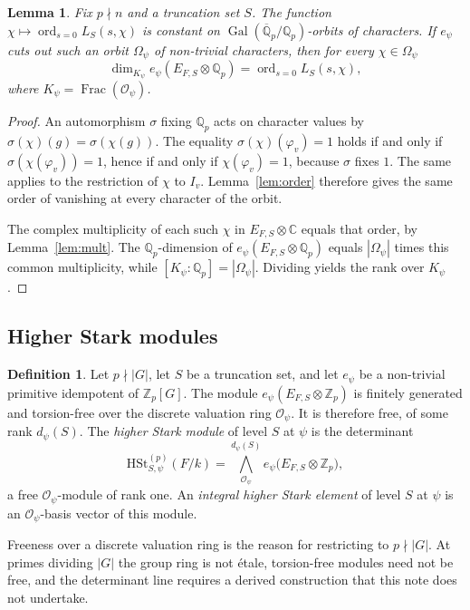 \documentclass[11pt]{article}
\theoremstyle{plain}
\newtheorem{lemma}[theorem]{Lemma}
\theoremstyle{definition}
\newtheorem{definition}[theorem]{Definition}
\theoremstyle{remark}
\newcommand{\Z}{\mathbb{Z}}
\newcommand{\Q}{\mathbb{Q}}
\newcommand{\C}{\mathbb{C}}
\newcommand{\OK}{\mathcal{O}}
\newcommand{\Gal}{\operatorname{Gal}}
\newcommand{\ord}{\operatorname{ord}}
\newcommand{\HSt}{\mathrm{HSt}}
\begin{document}
\begin{lemma}
\label{lem:orbit}
Fix $p\nmid n$ and a truncation set $S$.
The function $\chi\mapsto\ord_{s=0}L_S(s,\chi)$ is constant on $\Gal(\overline{\Q}_p/\Q_p)$-orbits of characters.
If $e_{\psi}$ cuts out such an orbit $\Omega_{\psi}$ of non-trivial characters, then for every $\chi\in\Omega_{\psi}$
\[
  \dim_{K_{\psi}}e_{\psi}(E_{F,S}\otimes\Q_p)
  =\ord_{s=0}L_S(s,\chi),
\]
where $K_{\psi}=\operatorname{Frac}(\OK_{\psi})$.
\end{lemma}

\begin{proof}
An automorphism $\sigma$ fixing $\Q_p$ acts on character values by $\sigma(\chi)(g)=\sigma(\chi(g))$.
The equality $\sigma(\chi)(\varphi_v)=1$ holds if and only if $\sigma(\chi(\varphi_v))=1$, hence if and only if $\chi(\varphi_v)=1$, because $\sigma$ fixes $1$.
The same applies to the restriction of $\chi$ to $I_v$.
Lemma~\ref{lem:order} therefore gives the same order of vanishing at every character of the orbit.

The complex multiplicity of each such $\chi$ in $E_{F,S}\otimes\C$ equals that order, by Lemma~\ref{lem:mult}.
The $\Q_p$-dimension of $e_{\psi}(E_{F,S}\otimes\Q_p)$ equals $|\Omega_{\psi}|$ times this common multiplicity, while $[K_{\psi}:\Q_p]=|\Omega_{\psi}|$.
Dividing yields the rank over $K_{\psi}$.
\end{proof}

\subsection{Higher Stark modules}

\begin{definition}
\label{def:hst}
Let $p\nmid|G|$, let $S$ be a truncation set, and let $e_{\psi}$ be a non-trivial primitive idempotent of $\Z_p[G]$.
The module $e_{\psi}(E_{F,S}\otimes\Z_p)$ is finitely generated and torsion-free over the discrete valuation ring $\OK_{\psi}$.
It is therefore free, of some rank $d_{\psi}(S)$.
The \emph{higher Stark module} of level $S$ at $\psi$ is the determinant
\[
  \HSt_{S,\psi}^{(p)}(F/k)
  =\bigwedge^{d_{\psi}(S)}_{\OK_{\psi}}
    e_{\psi}\bigl(E_{F,S}\otimes\Z_p\bigr),
\]
a free $\OK_{\psi}$-module of rank one.
An \emph{integral higher Stark element} of level $S$ at $\psi$ is an $\OK_{\psi}$-basis vector of this module.
\end{definition}

Freeness over a discrete valuation ring is the reason for restricting to $p\nmid|G|$.
At primes dividing $|G|$ the group ring is not \'etale, torsion-free modules need not be free, and the determinant line requires a derived construction that this note does not undertake.
\end{document}
